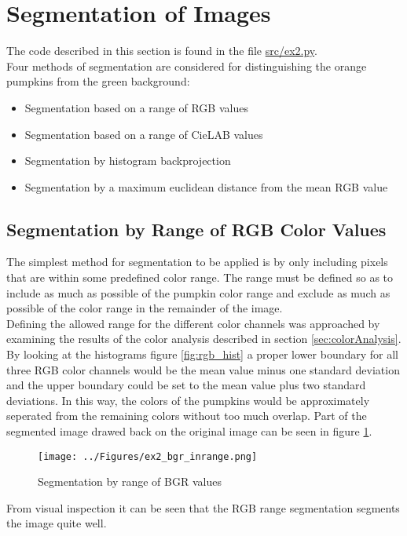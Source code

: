 \documentclass[../Head/Main.tex]{subfiles}
\begin{document}
\section{Segmentation of Images} \label{sec:seg}
The code described in this section is found in the file \url{src/ex2.py}.\\
Four methods of segmentation are considered for distinguishing the orange pumpkins from the green background:
\begin{itemize}
\item Segmentation based on a range of RGB values
\item Segmentation based on a range of CieLAB values
\item Segmentation by histogram backprojection
\item Segmentation by a maximum euclidean distance from the mean RGB value
\end{itemize}

\subsection{Segmentation by Range of RGB Color Values}
The simplest method for segmentation to be applied is by only including pixels that are within some predefined color range. The range must be defined so as to include as much as possible of the pumpkin color range and exclude as much as possible of the color range in the remainder of the image.\\
Defining the allowed range for the different color channels was approached by examining the results of the color analysis described in section \ref{sec:colorAnalysis}. By looking at the histograms figure \ref{fig:rgb_hist} a proper lower boundary for all three RGB color channels would be the mean value minus one standard deviation and the upper boundary could be set to the mean value plus two standard deviations. In this way, the colors of the pumpkins would be approximately seperated from the remaining colors without too much overlap. Part of the segmented image drawed back on the original image can be seen in figure \ref{fig:bgrSeg}.

\begin{figure}[H]
\centering
\texttt{[image: ../Figures/ex2\_bgr\_inrange.png]}
\caption{Segmentation by range of BGR values}
\label{fig:bgrSeg}
\end{figure}

From visual inspection it can be seen that the RGB range segmentation segments the image quite well. 
\end{document}
